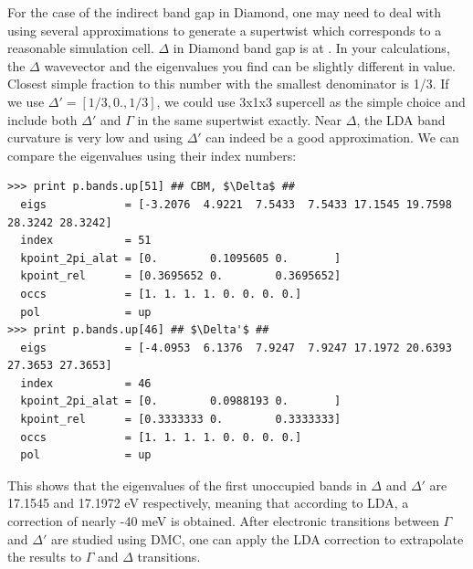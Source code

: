 For the case of the indirect band gap in Diamond, one may need to deal with using several approximations to generate a supertwist which corresponds to a reasonable simulation cell. 
$\Delta$ in Diamond band gap is at \ishell{[0.3695653, 0., 0.3695653]}. 
In your calculations, the $\Delta$ wavevector and the eigenvalues you find can be slightly different in value. 
Closest simple fraction to this number with the smallest denominator is 1/3. If we use $\Delta'=[1/3, 0., 1/3]$, we could use 3x1x3 supercell as the simple choice and include both $\Delta'$ and $\Gamma$ in the same supertwist exactly. 
Near  $\Delta$, the LDA band curvature is very low and using  $\Delta'$ can indeed be a good approximation. 
We can compare the eigenvalues using their index numbers:
\begin{lstlisting}[mathescape=true,style=Python]
>>> print p.bands.up[51] ## CBM, $\Delta$ ##
  eigs            = [-3.2076  4.9221  7.5433  7.5433 17.1545 19.7598 28.3242 28.3242]
  index           = 51
  kpoint_2pi_alat = [0.        0.1095605 0.       ]
  kpoint_rel      = [0.3695652 0.        0.3695652]
  occs            = [1. 1. 1. 1. 0. 0. 0. 0.]
  pol             = up
>>> print p.bands.up[46] ## $\Delta'$ ##
  eigs            = [-4.0953  6.1376  7.9247  7.9247 17.1972 20.6393 27.3653 27.3653]
  index           = 46
  kpoint_2pi_alat = [0.        0.0988193 0.       ]
  kpoint_rel      = [0.3333333 0.        0.3333333]
  occs            = [1. 1. 1. 1. 0. 0. 0. 0.]
  pol             = up
\end{lstlisting}
This shows that the eigenvalues of the first unoccupied bands in $\Delta$ and $\Delta'$ are 17.1545 and 17.1972 eV respectively, meaning that according to LDA, a correction of nearly -40 meV is obtained. 
After electronic transitions between $\Gamma$ and $\Delta'$ are studied using DMC, one can apply the LDA correction to extrapolate the results to $\Gamma$ and $\Delta$ transitions.

